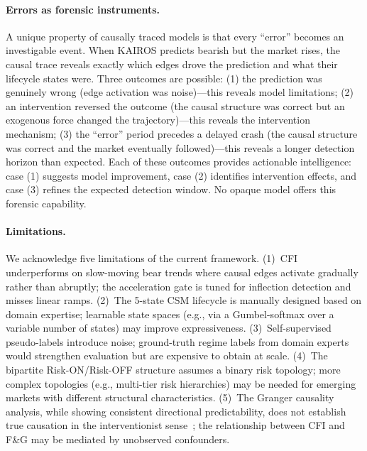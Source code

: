 \documentclass[11pt]{article}
\begin{document}
\paragraph{Errors as forensic instruments.} A unique property of causally traced models is that every ``error'' becomes an investigable event. When KAIROS predicts bearish but the market rises, the causal trace reveals exactly which edges drove the prediction and what their lifecycle states were. Three outcomes are possible: (1) the prediction was genuinely wrong (edge activation was noise)---this reveals model limitations; (2) an intervention reversed the outcome (the causal structure was correct but an exogenous force changed the trajectory)---this reveals the intervention mechanism; (3) the ``error'' period precedes a delayed crash (the causal structure was correct and the market eventually followed)---this reveals a longer detection horizon than expected. Each of these outcomes provides actionable intelligence: case (1) suggests model improvement, case (2) identifies intervention effects, and case (3) refines the expected detection window. No opaque model offers this forensic capability.

\paragraph{Limitations.} We acknowledge five limitations of the current framework. (1)~CFI underperforms on slow-moving bear trends where causal edges activate gradually rather than abruptly; the acceleration gate is tuned for inflection detection and misses linear ramps. (2)~The 5-state CSM lifecycle is manually designed based on domain expertise; learnable state spaces (e.g., via a Gumbel-softmax over a variable number of states) may improve expressiveness. (3)~Self-supervised pseudo-labels introduce noise; ground-truth regime labels from domain experts would strengthen evaluation but are expensive to obtain at scale. (4)~The bipartite Risk-ON/Risk-OFF structure assumes a binary risk topology; more complex topologies (e.g., multi-tier risk hierarchies) may be needed for emerging markets with different structural characteristics. (5)~The Granger causality analysis, while showing consistent directional predictability, does not establish true causation in the interventionist sense~\citep{granger1969}; the relationship between CFI and F\&G may be mediated by unobserved confounders.

\end{document}
